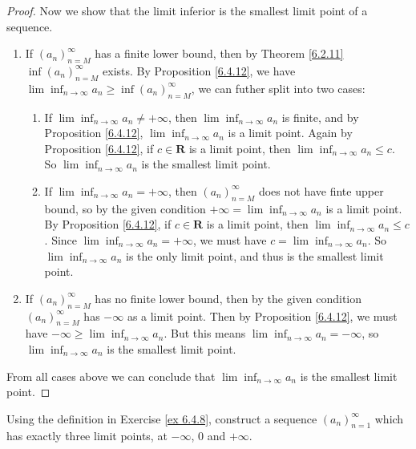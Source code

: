 \begin{proof}
Now we show that the limit inferior is the smallest limit point of a sequence.
\begin{enumerate}
    \item If \((a_n)_{n = M}^\infty\) has a finite lower bound, then by Theorem \ref{6.2.11} \(\inf(a_n)_{n = M}^\infty\) exists.
    By Proposition \ref{6.4.12}, we have \(\lim\inf_{n \to \infty} a_n \geq \inf(a_n)_{n = M}^\infty\), we can futher split into two cases:
    \begin{enumerate}[label=(\Roman*)]
        \item If \(\lim\inf_{n \to \infty} a_n \neq +\infty\), then \(\lim\inf_{n \to \infty} a_n\) is finite, and by Proposition \ref{6.4.12}, \(\lim\inf_{n \to \infty} a_n\) is a limit point.
        Again by Proposition \ref{6.4.12}, if \(c \in \mathbf{R}\) is a limit point, then \(\lim\inf_{n \to \infty} a_n \leq c\).
        So \(\lim\inf_{n \to \infty} a_n\) is the smallest limit point.
        \item If \(\lim\inf_{n \to \infty} a_n = +\infty\), then \((a_n)_{n = M}^\infty\) does not have finte upper bound, so by the given condition \(+\infty = \lim\inf_{n \to \infty} a_n\) is a limit point.
        By Proposition \ref{6.4.12}, if \(c \in \mathbf{R}\) is a limit point, then \(\lim\inf_{n \to \infty} a_n \leq c\).
        Since \(\lim\inf_{n \to \infty} a_n = +\infty\), we must have \(c = \lim\inf_{n \to \infty} a_n\).
        So \(\lim\inf_{n \to \infty} a_n\) is the only limit point, and thus is the smallest limit point.
    \end{enumerate}
    \item If \((a_n)_{n = M}^\infty\) has no finite lower bound, then by the given condition \((a_n)_{n = M}^\infty\) has \(-\infty\) as a limit point.
    Then by Proposition \ref{6.4.12}, we must have \(-\infty \geq \lim\inf_{n \to \infty} a_n\).
    But this means \(\lim\inf_{n \to \infty} a_n = -\infty\), so \(\lim\inf_{n \to \infty} a_n\) is the smallest limit point.
\end{enumerate}
From all cases above we can conclude that \(\lim\inf_{n \to \infty} a_n\) is the smallest limit point.
\end{proof}

\begin{exercise}\label{ex 6.4.9}
Using the definition in Exercise \ref{ex 6.4.8}, construct a sequence \((a_n)_{n = 1}^\infty\) which has exactly three limit points, at \(-\infty\), \(0\) and \(+\infty\).
\end{exercise}

